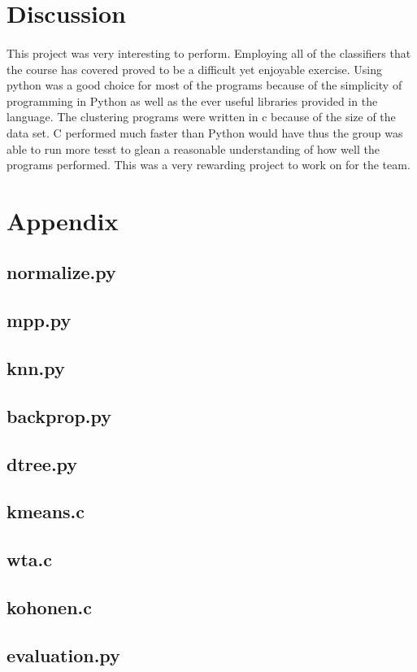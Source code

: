 \documentclass{article}
\begin{document}
\section*{Discussion}
\paragraph{}
This project was very interesting to perform. Employing all of the classifiers that the course has covered
proved to be a difficult yet enjoyable exercise. Using python was a good choice for most of the programs 
because of the simplicity of programming in Python as well as the ever useful libraries provided in the language.
The clustering programs were written in c because of the size of the data set. C performed much faster than Python would have
thus the group was able to run more tesst to glean a reasonable understanding of how well the programs performed. This was a very
rewarding project to work on for the team. 
\newpage


\appendix
\section*{Appendix}
\subsection*{normalize.py}

\newpage
\subsection*{mpp.py}

\newpage
\subsection*{knn.py}

\newpage
\subsection*{backprop.py}

\newpage
\subsection*{dtree.py}

\newpage
\subsection*{kmeans.c}

\newpage
\subsection*{wta.c}

\newpage
\subsection*{kohonen.c}

\newpage
\subsection*{evaluation.py}

\newpage
\end{document}
